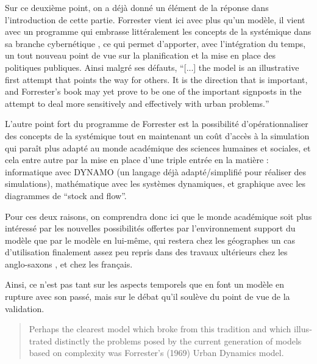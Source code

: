 Sur ce deuxième point, on a déjà donné un élément de la réponse dans l'introduction de cette partie. Forrester vient ici avec plus qu'un modèle, il vient avec un programme \autocite{Forrester1961} qui embrasse littéralement les concepts de la systémique dans sa branche cybernétique \autocite{Berry1970b}, ce qui permet d'apporter, avec l'intégration du temps, un tout nouveau point de vue sur la planification et la mise en place des politiques publiques. Ainsi malgré ses défauts, \foreignquote{english}{[...] the model is an illustrative first attempt that points the way for others. It is the direction that is important, and Forrester's book may yet prove to be one of the important signposts in the attempt to deal more sensitively and effectively with urban problems.} \autocite{Berry1970b}

L'autre point fort du programme de Forrester est la possibilité d'opérationnaliser des concepts de la systémique tout en maintenant un coût d'accès à la simulation qui paraît plus adapté au monde académique des sciences humaines et sociales, et cela entre autre par la mise en place d'une triple entrée en la matière : informatique avec DYNAMO (un langage déjà adapté/simplifié pour réaliser des simulations), mathématique avec les systèmes dynamiques, et graphique avec les diagrammes de \foreignquote{english}{stock and flow}.


Pour ces deux raisons, on comprendra donc ici que le monde académique soit plus intéressé par les nouvelles possibilités offertes par l'environnement support du modèle que par le modèle en lui-même, qui restera chez les géographes un cas d'utilisation finalement assez peu repris dans des travaux ultérieurs chez les anglo-saxons \autocite[308]{Batty1976}, et chez les français. %

Ainsi, ce n'est pas tant sur les aspects temporels que \textcite{Batty2001} en font un modèle en rupture avec son passé, mais sur le débat qu'il soulève du point de vue de la validation.

\foreignblockquote{english}[\cite{Batty2001}]{Perhaps the clearest model which broke from this tradition and which illustrated distinctly the problems posed by the current generation of models based on complexity was Forrester’s (1969) Urban Dynamics model.} \autocite{Batty2001}

